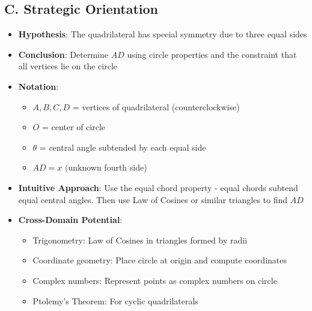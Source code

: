 \documentclass[12pt]{article}
\begin{document}
\begin{problemconfigbox}
\subsection*{C. Strategic Orientation}
\begin{itemize}[leftmargin=*]
    \item \textbf{Hypothesis}: The quadrilateral has special symmetry due to three equal sides
    \item \textbf{Conclusion}: Determine $AD$ using circle properties and the constraint that all vertices lie on the circle
    \item \textbf{Notation}: 
    \begin{itemize}
        \item $A, B, C, D$ = vertices of quadrilateral (counterclockwise)
        \item $O$ = center of circle
        \item $\theta$ = central angle subtended by each equal side
        \item $AD = x$ (unknown fourth side)
    \end{itemize}
    \item \textbf{Intuitive Approach}: Use the equal chord property - equal chords subtend equal central angles. Then use Law of Cosines or similar triangles to find $AD$
    \item \textbf{Cross-Domain Potential}: 
    \begin{itemize}
        \item Trigonometry: Law of Cosines in triangles formed by radii
        \item Coordinate geometry: Place circle at origin and compute coordinates
        \item Complex numbers: Represent points as complex numbers on circle
        \item Ptolemy's Theorem: For cyclic quadrilaterals
    \end{itemize}
\end{itemize}
\end{problemconfigbox}
\end{document}
